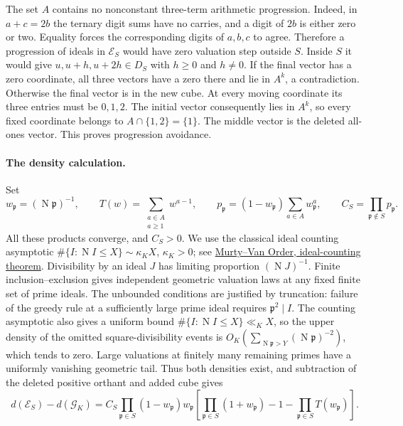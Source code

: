 The set $A$ contains no nonconstant three-term arithmetic progression.
Indeed, in $a+c=2b$ the ternary digit sums have no carries, and a digit of
$2b$ is either zero or two. Equality forces the corresponding digits
of $a,b,c$ to agree. Therefore a progression of ideals in $\mathcal E_S$
would have zero valuation step outside $S$. Inside $S$ it would give
$u,u+h,u+2h\in D_S$ with $h\ge0$ and $h\ne0$.
If the final vector has a zero coordinate, all three vectors have a zero
there and lie in $A^k$, a contradiction. Otherwise the final vector is
in the new cube. At every moving coordinate its three entries must be
$0,1,2$. The initial vector consequently lies in $A^k$, so every fixed
coordinate belongs to $A\cap\{1,2\}=\{1\}$. The middle vector is the
deleted all-ones vector. This proves progression avoidance.

\paragraph{The density calculation.}
Set
\[
 w_{\mathfrak p}=(\operatorname N\mathfrak p)^{-1},\qquad
 T(w)=\sum_{\substack{a\in A\\a\ge1}}w^{a-1},\qquad
 p_{\mathfrak p}=(1-w_{\mathfrak p})\sum_{a\in A}w_{\mathfrak p}^{a},
 \qquad C_S=\prod_{\mathfrak p\notin S}p_{\mathfrak p}.
\]
All these products converge, and $C_S>0$. We use the classical ideal
counting asymptotic
$\#\{I:\operatorname NI\le X\}\sim\kappa_KX$, $\kappa_K>0$;
see \href{https://doi.org/10.1016/j.exmath.2006.08.001}{Murty--Van Order,
ideal-counting theorem}. Divisibility by an ideal $J$ has limiting proportion
$(\operatorname NJ)^{-1}$. Finite inclusion--exclusion gives independent
geometric valuation laws at any fixed finite set of prime ideals.
The unbounded conditions are justified by truncation: failure of the
greedy rule at a sufficiently large prime ideal requires
$\mathfrak p^2\mid I$. The counting asymptotic also gives a uniform
bound $\#\{I:\operatorname NI\le X\}\ll_K X$, so the upper density of
the omitted square-divisibility events is
$O_K(\sum_{\operatorname N\mathfrak p>Y}(\operatorname N\mathfrak p)^{-2})$,
which tends to zero. Large valuations at finitely many remaining primes
have a uniformly vanishing geometric tail. Thus both densities exist,
and subtraction of the deleted positive orthant and added cube gives
\begin{equation}\label{eq:ideal-natural-delta}
 d(\mathcal E_S)-d(\mathcal G_K)
 =C_S\prod_{\mathfrak p\in S}(1-w_{\mathfrak p})w_{\mathfrak p}
 \left[\prod_{\mathfrak p\in S}(1+w_{\mathfrak p})-1
                    -\prod_{\mathfrak p\in S}T(w_{\mathfrak p})\right].
\end{equation}

